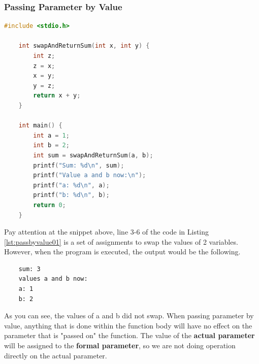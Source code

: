 \subsubsection{Passing Parameter by Value}

\begin{lstlisting}[language=c,caption = Passing by Value,label=lst:passbyvalue01]
    #include <stdio.h>

    int swapAndReturnSum(int x, int y) {
        int z;
        z = x;
        x = y;
        y = z;
        return x + y;
    }
    
    int main() {
        int a = 1;
        int b = 2;
        int sum = swapAndReturnSum(a, b);
        printf("Sum: %d\n", sum);
        printf("Value a and b now:\n");
        printf("a: %d\n", a);
        printf("b: %d\n", b);
        return 0;
    }
\end{lstlisting}

Pay attention at the snippet above, line 3-6 of the code
in Listing \ref{lst:passbyvalue01} is a set of assignments
to swap the values of 2 variables. However, when the program
is executed, the output would be the following.
\begin{verbatim}
    sum: 3
    values a and b now:
    a: 1
    b: 2
\end{verbatim}
As you can see, the values of a and b did not swap.
When passing parameter by value, anything that is done
within the function body will have no effect on the
parameter that is "passed on" the function. The value of
the \textbf{actual parameter} will be assigned to the \textbf{formal parameter},
so we are not doing operation directly on the actual parameter.


